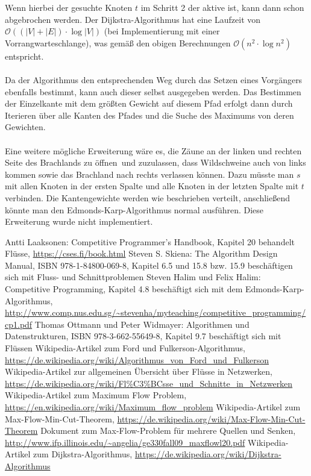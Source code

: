 \documentclass[a4paper, notitlepage, 12pt]{scrartcl}
\begin{document}
Wenn hierbei der gesuchte Knoten $t$ im Schritt 2 der aktive ist, kann dann schon abgebrochen werden.
Der Dijkstra-Algorithmus hat eine Laufzeit von $\mathcal{O}((|V|+|E|) \cdot \log |V|)$ (bei Implementierung mit einer Vorrangwarteschlange), was gemäß den obigen Berechnungen $\mathcal{O}(n^{2} \cdot \log n^{2})$ entspricht. \\ \\ Da der Algorithmus den entsprechenden Weg durch das Setzen eines Vorgängers ebenfalls bestimmt, kann auch dieser selbst ausgegeben werden. Das Bestimmen der Einzelkante mit dem größten Gewicht auf diesem Pfad erfolgt dann durch Iterieren über alle Kanten des Pfades und die Suche des Maximums von deren Gewichten. \\ \\
Eine weitere mögliche Erweiterung wäre es, die Zäune an der linken und rechten Seite des Brachlands zu \glqq öffnen\grqq ~und zuzulassen, dass Wildschweine auch von links kommen sowie das Brachland nach rechts verlassen können. Dazu müsste man $s$ mit allen Knoten in der ersten Spalte und alle Knoten in der letzten Spalte mit $t$ verbinden. Die Kantengewichte werden wie beschrieben verteilt, anschließend könnte man den Edmonds-Karp-Algorithmus normal ausführen. Diese Erweiterung wurde nicht implementiert.
\begin{thebibliography}{xx}
 Antti Laaksonen: Competitive Programmer’s Handbook, Kapitel 20 behandelt Flüsse, \url{https://cses.fi/book.html} 
 Steven S. Skiena: The Algorithm Design Manual, ISBN 978-1-84800-069-8, Kapitel 6.5 und 15.8 bzw. 15.9 beschäftigen sich mit Fluss- und Schnittproblemen
 Steven Halim und Felix Halim: Competitive Programming, Kapitel 4.8 beschäftigt sich mit dem Edmonds-Karp-Algorithmus, \url{http://www.comp.nus.edu.sg/~stevenha/myteaching/competitive_programming/cp1.pdf}
 Thomas Ottmann und Peter Widmayer: Algorithmen und Datenstrukturen, ISBN 978-3-662-55649-8, Kapitel 9.7 beschäftigt sich mit Flüssen
 Wikipedia-Artikel zum Ford und Fulkerson-Algorithmus, \url{https://de.wikipedia.org/wiki/Algorithmus_von_Ford_und_Fulkerson}
 Wikipedia-Artikel zur allgemeinen Übersicht über Flüsse in Netzwerken, \url{https://de.wikipedia.org/wiki/Fl\%C3\%BCsse_und_Schnitte_in_Netzwerken}
 Wikipedia-Artikel zum Maximum Flow Problem, \url{https://en.wikipedia.org/wiki/Maximum_flow_problem}
 Wikipedia-Artikel zum Max-Flow-Min-Cut-Theorem, \url{https://de.wikipedia.org/wiki/Max-Flow-Min-Cut-Theorem}
 Dokument zum Max-Flow-Problem für mehrere Quellen und Senken, \url{http://www.ifp.illinois.edu/~angelia/ge330fall09_maxflowl20.pdf}
 Wikipedia-Artikel zum Dijkstra-Algorithmus, \url{https://de.wikipedia.org/wiki/Dijkstra-Algorithmus}
\end{thebibliography}
\end{document}
